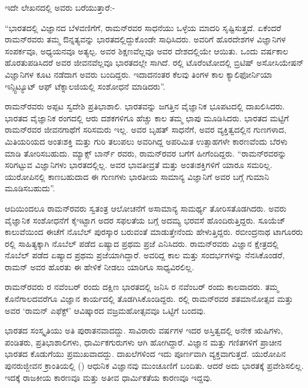 ಇದೇ ಲೇಖನದಲ್ಲಿ ಅವರು ಬರೆಯುತ್ತಾರೆ:-

“ಭಾರತದಲ್ಲಿ ವಿಜ್ಞಾನದ ಬೆಳವಣಿಗೆಗೆ, ರಾಮನ್‍ರವರ ಸಾಧನೆಯು ಒಳ್ಳೆಯ ಮಾದರಿ ಸೃಷ್ಟಿಸುತ್ತದೆ. ಏಕೆಂದರೆ ರಾಮನ್‍ರವರು ತಮ್ಮ ಔನ್ನತ್ಯವನ್ನು ಭಾರತದಲ್ಲಿದ್ದುಕೊಂಡೇ ಸಾಧಿಸಿದರು. ಅವರಿಗೆ ಹೊರದೇಶಗಳ ವಿಜ್ಞಾನಿಗಳ ಸಂಪರ್ಕವೂ, ಅಧ್ಯಯನವೂ ಅತ್ಯಲ್ಪ. ಅವರ ಶಿಕ್ಷಣವೆಲ್ಲವೂ ಅವರ ದೇಶದಲ್ಲಿಯೇ ಆಯಿತು. ಒಂದು ವರ್ಷಕಾಲ ಹೊರತುಪಡಿಸಿದರೆ ಅವರ ಜೀವನವೆಲ್ಲವೂ ಭಾರತದಲ್ಲೇ ಸಾಗಿದೆ. ರಲ್ಲಿ ಟೊರೆಂಟೋದಲ್ಲಿ ಬ್ರಿಟಿಷ್ ಅಸೋಸಿಯೇಷನ್ ವಿಜ್ಞಾನಿಗಳ ಕೂಟ ನಡೆದಾಗ ಅವರು ಬಂದಿದ್ದರು. ಇದಾದನಂತರ ಕೆಲವು ತಿಂಗಳ ಕಾಲ ಕ್ಯಾಲಿಫೋರ್ನಿಯಾ ಇನ್ಸ್ಟಿಟ್ಯೂಟ್ ಆಫ್ ಟೆಕ್ನಾಲಜಿಯಲ್ಲಿ ಸಂಶೋಧನೆ ಮಾಡಿದರು”.

ರಾಮನ್‍ರವರು ಅಪ್ಪಟ ಸ್ವದೇಶಿ ಪ್ರತಿಭಾಶಾಲಿ. ಭಾರತವನ್ನು ಜಗತ್ತಿನ ವೈಜ್ಞಾನಿಕ ಭೂಪಟದಲ್ಲಿ ದಾಖಲಿಸಿದರು. ಭಾರತದ ವೈಜ್ಞಾನಿಕ ರಂಗದಲ್ಲಿ ಆರು ದಶಕಗಳಿಗೂ ಹೆಚ್ಚು ಕಾಲ ತಮ್ಮ ಛಾಪು ಮೂಡಿಸಿದರು. ಭಾರತದ ಮಟ್ಟಿಗೆ ರಾಮನ್‍ರವರ ಜೀವನಗಾಥೆಗೆ ಸರಿಸಮರು ಇಲ್ಲ. ಅವರ ಬೃಹತ್ ಸಾಧನೆಗೆ, ಅವರ ವ್ಯಕ್ತಿತ್ವದಲ್ಲಿನ ಗುಣಗಳಾದ, ಮಿತಿಯರಿಯದ ಅಂತಃಶಕ್ತಿ ಮತ್ತು ಗುರಿ ತಲುಪಲು ಅವರಿಗಿದ್ದ ಅಪರಿಮಿತ ಉತ್ಸಾಹಗಳೇ ಕಾರಣವೆಂದು ಬೆರಳು ಮಾಡಿ ತೋರಿಸಬಹುದು. ಮ್ಯಾಕ್ಸ್ ಬಾರ್ನ್ ರವರು, ರಾಮನ್‍ರವರ ಬಗೆಗೆ ಹೀಗೆಂದಿದ್ದರು.  “ರಾಮನ್‍ರವರನ್ನು ಸರಿಗಟ್ಟುವ ವಿಜ್ಞಾನಿಗಳು ಭಾರತದಲ್ಲಿಲ್ಲ. ಅವರ ಭಾವತೀವ್ರತೆ ಮತ್ತು ಅಂತಃಶಕ್ತಿಗಳಿಗೆ ಯಾರೂ ಸಮರಿಲ್ಲ. ಯುರೋಪಿನಲ್ಲಿ ಕಾಣಬಹುದಾದ ಈ ಗುಣಗಳು ಭಾರತೀಯ ಸಾಮಾನ್ಯ ವಿಜ್ಞಾನಿಗೆ ಅವರ ಬಗ್ಗೆ ಗುಮಾನಿ ಮೂಡಿಸಬಹುದು”.

ಆದಿಯಿಂದಲೂ ರಾಮನ್‍ರವರು ಸ್ವತಂತ್ರ ಆಲೋಚನೆಗೆ ಅಸಾಮಾನ್ಯ ಸಾಮರ್ಥ್ಯ ತೋರಿಸತೊಡಗಿದರು. ಅವರು ವೈಜ್ಞಾನಿಕ ಸಂಶೋಧನೆಗೆ ಕೈಇಟ್ಟಾಗ ಅದರ ಸಫಲತೆಯ ಬಗ್ಗೆ ಅದಮ್ಯ ಭರವಸೆ ಹೊಂದಿರುತ್ತಿದ್ದರು. ಸೂಯೆಜ್ ಕಾಲುವೆಯಿಂದ ಈಚೆಗೆ ನೊಬೆಲ್ ಪುರಸ್ಕಾರ ಬರುವಂತೆ ಮಾಡುತ್ತೇನೆಂದು ಹೇಳುತ್ತಿದ್ದರು. ರಬೀಂದ್ರನಾಥ ಟಾಗೂರರು ರಲ್ಲಿ ಸಾಹಿತ್ಯಕ್ಕಾಗಿ ನೊಬೆಲ್ ಪಡೆದ ಏಷ್ಯಾದ ಪ್ರಥಮ ಪ್ರಜೆ ಎನಿಸಿದರು. ರಾಮನ್‍ರವರು ವಿಜ್ಞಾನ ಕ್ಷೇತ್ರದಲ್ಲಿ ನೊಬೆಲ್ ಪಡೆದ ಏಷ್ಯಾದ ಪ್ರಥಮ ಪ್ರಜೆಯಾಗಿದ್ದಾರೆ. ಅವರಿದ್ದ ಕಾಲ ಮತ್ತು ಸಂದರ್ಭಗಳನ್ನು ನೆನಸಿಕೊಂಡರೆ, ರಾಮನ್‍ ಅವರ ಹೊರತು ಈ ಹೇಳಿಕೆ ನೀಡಲು ಯಾರಿಗೂ ಸಾಧ್ಯವಿರಲಿಲ್ಲ.

ರಾಮನ್‍ರವರು ರ ನವೆಂಬರ್ ರಂದು ದಕ್ಷಿಣ ಭಾರತದಲ್ಲಿ ಜನಿಸಿ ರ ನವೆಂಬರ್ ರಂದು ಕಾಲವಾದರು. ತಮ್ಮ ಕೊನೆಗಾಲದವರೆಗೂ ವಿಜ್ಞಾನ ಕಾರ್ಯದಲ್ಲಿ ತೊಡಗಿಸಿಕೊಂಡಿದ್ದರು. ರಲ್ಲಿ ರಾಮನ್‍ರವರ ಶತಮಾನೋತ್ಸವ ಮತ್ತು ಅವರ ‘ರಾಮನ್ ಎಫೆಕ್ಟ್’ ಆವಿಷ್ಕಾರದ ವಜ್ರಮಹೋತ್ಸವವೂ ಒಟ್ಟಿಗೆ ಬಂದವು.



ಭಾರತದ ಸಂಸ್ಕೃತಿಯು ಅತಿ ಪುರಾತನವಾದದ್ದು. ಸಾವಿರಾರು ವರ್ಷಗಳ ಇದರ ಅಸ್ತಿತ್ವದಲ್ಲಿ ಅನೇಕ ಋಷಿಗಳು, ಪಂಡಿತರು, ಪ್ರತಿಭಾಶಾಲಿಗಳು, ಧಾರ್ಮಿಕಗುರುಗಳು ಆಗಿ ಹೋಗಿದ್ದಾರೆ. ವಿಜ್ಞಾನ ಮತ್ತು ಗಣಿತಗಳಿಗೆ ಪ್ರಾಚೀನ ಭಾರತದ ಕೊಡುಗೆಯು ಪ್ರಮುಖವಾದದ್ದು. ದಾಖಲೆಗಳಿಂದ ಇದು ಪೂರ್ಣವಾಗಿ ವ್ಯಕ್ತವಾಗುತ್ತದೆ. ಯುರೋಪಿನ ಪುನರುಜ್ಜೀವನ ಕ್ರಾಂತಿಯಲ್ಲಿ () ಆಧುನಿಕ ವಿಜ್ಞಾನವು ಮುಂಚೂಣಿಗೆ ಬಂದಿತು. ಆದರೆ ಅದು ಭಾರತಕ್ಕೆ ಪ್ರವೇಶಿಸಲಿಲ್ಲ. ಇದಕ್ಕೆ ರಾಜಕೀಯ ಕಾರಣವೂ ಮತ್ತು ಅತೀವ ಧಾರ್ಮಿಕತೆಯ ಕಾರಣವೂ ಇದ್ದವು.

